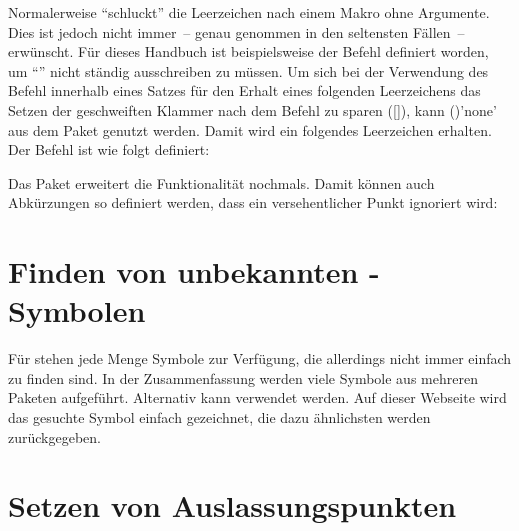 Normalerweise \enquote{schluckt}  die Leerzeichen nach einem 
Makro ohne Argumente. Dies ist jedoch nicht immer~-- genau genommen in den 
seltensten Fällen~-- erwünscht. Für dieses Handbuch ist beispielsweise der 
Befehl  definiert worden, um \enquote{\TUD{}} nicht ständig 
ausschreiben zu müssen. Um sich bei der Verwendung des Befehl innerhalb eines 
Satzes für den Erhalt eines folgenden Leerzeichens das Setzen der geschweiften 
Klammer nach dem Befehl zu sparen ([\MPValue{}]), kann 
()'none' aus dem Paket  genutzt 
werden. Damit wird ein folgendes Leerzeichen erhalten. Der Befehl  
ist wie folgt definiert:
%
\begin{quoting}
\begin{Code}
\newcommand*{\TUD}{Technische Universit\"at Dresden\xspace}
\end{Code}
\end{quoting}
%
Das Paket  erweitert die Funktionalität nochmals. Damit 
können auch Abkürzungen so definiert werden, dass ein versehentlicher Punkt 
ignoriert wird:
%
\begin{quoting}
\begin{Code}
\newcommand*{\zB}{z.\,B\xperiod}
\end{Code}
\end{quoting}



\section{%
  Finden von unbekannten -Symbolen%
}

Für  stehen jede Menge Symbole zur Verfügung, die allerdings 
nicht immer einfach zu finden sind. In der Zusammenfassung
%
{}
werden viele Symbole aus mehreren Paketen aufgeführt. Alternativ kann 
 verwendet werden. 
Auf dieser Webseite wird das gesuchte Symbol einfach gezeichnet, die dazu 
ähnlichsten werden zurückgegeben.



\section{%
  Setzen von Auslassungspunkten%
  \label{sec:tips:dots}%
}

